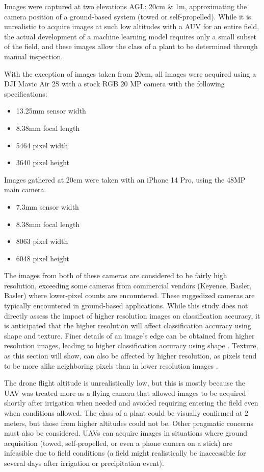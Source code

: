 \documentclass[letterpaper]{report}
\begin{document}
Images were captured at two elevations \gls{AGL}: 20cm \& 1m, approximating the camera position of a ground-based system (towed or self-propelled). While it is unrealistic to acquire images at such low altitudes with a AUV for an entire field, the actual development of a machine learning model requires only a small subset of the field, and these images allow the class of a plant to be determined through manual inspection. 

With the exception of images taken from 20cm, all images were acquired using a DJI Mavic Air 2S with a stock RGB 20 MP camera with the following specifications:

\begin{itemize}
	\item{13.25mm sensor width}
	\item{8.38mm focal length}
	\item{5464 pixel width}
	\item{3640 pixel height}
\end{itemize}

Images gathered at 20cm were taken with an iPhone 14 Pro, using the 48MP main camera.

\begin{itemize}
	\item{7.3mm sensor width}
	\item{8.38mm focal length}
	\item{8063 pixel width}
	\item{6048 pixel height}
\end{itemize}

The images from both of these cameras are considered to be fairly high resolution, exceeding some cameras from commercial vendors (Keyence, Basler, Basler) where lower-pixel counts are encountered. These ruggedized cameras are typically encountered in ground-based applications. While this study does not directly assess the impact of higher resolution images on classification accuracy, it is anticipated that the higher resolution will affect classification accuracy using shape and texture. Finer details of an image's edge can be obtained from higher resolution images, leading to higher classification accuracy using shape \parencite{Kroner2013-rm}. Texture, as this section will show, can also be affected by higher resolution, as pixels tend to be more alike neighboring pixels than in lower resolution images \parencite{Kupidura2022-xe}. 

The drone flight altitude is unrealistically low, but this is mostly because the UAV was treated more as a flying camera that allowed images to be acquired shortly after irrigation when needed and avoided requiring entering the field even when conditions allowed. The class of a plant could be visually confirmed at 2 meters, but those from higher altitudes could not be. Other pragmatic concerns must also be considered. UAVs can acquire images in situations where ground acquisition (towed, self-propelled, or even a phone camera on a stick) are infeasible due to field conditions (a field might realistically be inaccessible for several days after irrigation or precipitation event).
\end{document}
